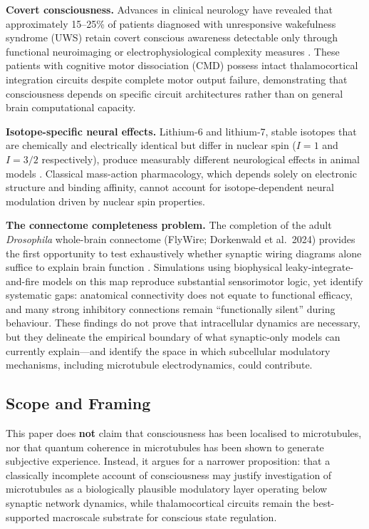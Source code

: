 \documentclass[10pt, a4paper, twocolumn]{article}
\begin{document}
\textbf{Covert consciousness.} Advances in clinical neurology have
revealed that approximately 15--25\% of patients diagnosed with
unresponsive wakefulness syndrome (UWS) retain covert conscious
awareness detectable only through functional neuroimaging or
electrophysiological complexity measures
\cite{edlow2021,casarotto2016}. These patients with cognitive motor
dissociation (CMD) possess intact thalamocortical integration circuits
despite complete motor output failure, demonstrating that consciousness
depends on specific circuit architectures rather than on general brain
computational capacity.

\textbf{Isotope-specific neural effects.} Lithium-6 and lithium-7,
stable isotopes that are chemically and electrically identical but differ
in nuclear spin ($I=1$ and $I=3/2$ respectively), produce measurably
different neurological effects in animal models
\cite{fisher2015,ettenberg2020,wink2025}. Classical mass-action
pharmacology, which depends solely on electronic structure and binding
affinity, cannot account for isotope-dependent neural modulation driven
by nuclear spin properties.

\textbf{The connectome completeness problem.} The completion of
the adult \textit{Drosophila} whole-brain connectome (FlyWire;
Dorkenwald et al.\ 2024) provides the first opportunity to test
exhaustively whether synaptic wiring diagrams alone suffice to
explain brain function \cite{dorkenwald2024}. Simulations using
biophysical leaky-integrate-and-fire models on this map reproduce
substantial sensorimotor logic, yet identify systematic gaps:
anatomical connectivity does not equate to functional efficacy,
and many strong inhibitory connections remain ``functionally
silent'' during behaviour. These findings do not prove
that intracellular dynamics are necessary, but they delineate the
empirical boundary of what synaptic-only models can currently
explain---and identify the space in which subcellular modulatory
mechanisms, including microtubule electrodynamics, could
contribute.

\subsection{Scope and Framing}

This paper does \textbf{not} claim that consciousness has been localised
to microtubules, nor that quantum coherence in microtubules has been
shown to generate subjective experience. Instead, it argues for a
narrower proposition: that a classically incomplete account of
consciousness may justify investigation of microtubules as a
biologically plausible modulatory layer operating below synaptic network
dynamics, while thalamocortical circuits remain the best-supported
macroscale substrate for conscious state regulation.
\end{document}
